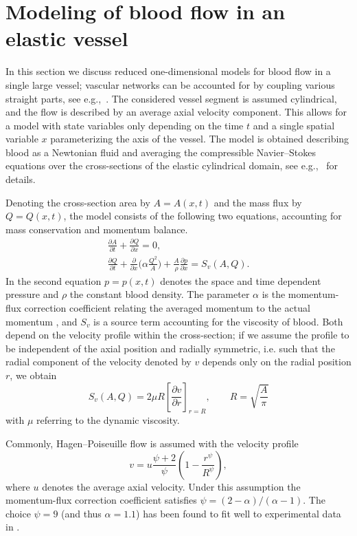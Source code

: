 \documentclass[a4paper,11pt]{article}
\begin{document}
\section{Modeling of blood flow in an elastic vessel}\label{sec:model}
In this section we discuss reduced one-dimensional models for blood flow in a single large vessel; vascular networks can be accounted for by coupling various straight parts, see e.g.,~\cite{formaggia2003}. The considered vessel segment is assumed cylindrical, and the flow is described by an average axial velocity component. This allows for a model with state variables only depending on the time $t$ and a single spatial variable $x$ parameterizing the axis of the vessel. The model is obtained describing blood as a Newtonian fluid and averaging the compressible Navier--Stokes equations over the cross-sections of the elastic cylindrical domain, see e.g.,~\cite{hughes1973} for details.

Denoting the cross-section area by $A=A(x,t)$ and the mass flux by $Q=Q(x,t)$, the model consists of the following two equations, accounting for mass conservation and momentum balance.
\begin{equation}\label{eq:systemQ}
	\begin{aligned}
		&\frac{\partial A}{\partial t} + \frac{\partial Q}{\partial x} = 0, \\
		& \frac{\partial Q}{\partial t} + \frac{\partial}{\partial x} \bigl(\alpha \frac{Q^2}{A} \bigr) + \frac{A}{\rho} \frac{\partial p}{\partial x} = S_v(A, Q).  &
	\end{aligned}
\end{equation}
In the second equation $p=p(x, t)$ denotes the space and time dependent pressure and $\rho$ the constant blood density.
The parameter $\alpha$ is the momentum-flux correction coefficient relating the averaged momentum to the actual momentum \cite{formaggia1999multismodelcirculsystem}, and $S_v$ is a source term accounting for the viscosity of blood. Both depend on the velocity profile within the cross-section; if we assume the profile to be independent of the axial position and radially symmetric, i.e. such that the radial component of the velocity denoted by $v$ depends only on the radial position $r$, we obtain
\begin{equation}
  S_v(A, Q) = 2 \mu R \left[ \frac{\partial v}{\partial r} \right]_{r=R}, \qquad R = \sqrt{\frac{A}{\pi}}
\end{equation}
with $\mu$ referring to the dynamic viscosity.

Commonly, Hagen--Poiseuille flow \cite{white1991viscous} is assumed with the velocity profile
\begin{equation}\label{eq:hpflow}
  v = u \frac{\psi + 2}{\psi} \left( 1 - \frac{r^\psi}{R^\psi}\right),
\end{equation}
where $u$ denotes the average axial velocity. Under this assumption the momentum-flux correction coefficient satisfies $\psi = (2-\alpha)/(\alpha -1)$. The choice $\psi=9$ (and thus $\alpha=1.1$) has been found to fit well to experimental data in \cite{smith2002}.
\end{document}

